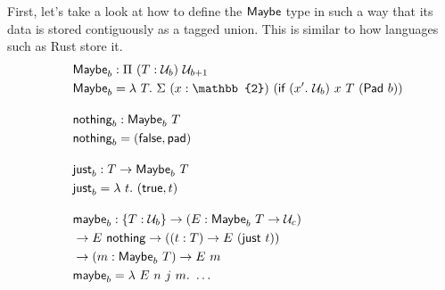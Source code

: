 First, let's take a look at how to define the \(\textsf{Maybe}\) type in
such a way that its data is stored contiguously as a tagged union. This
is similar to how languages such as Rust store it. \[
\begin{aligned}
&\syn{Maybe}_b : \Pi\ (T : \univ_b)\ \univ_{b + 1} \\
&\syn{Maybe}_b = \lambda\ T.\
\Sigma\ (x : \mathbb{2})\ (\syn{if}\ (x'.\ \univ_b)\ x\ T\ (\syn{Pad}\ b)) \\[1em]
&\syn{nothing}_b : \syn{Maybe}_b\ T \\
&\syn{nothing}_b = (\syn{false}, \syn{pad}) \\[1em]
&\syn{just}_b : T \to \syn{Maybe}_b\ T \\
&\syn{just}_b = \lambda\ t.\  (\syn{true}, t) \\[1em]
&\syn{maybe}_b : \{T : \univ_b\} \to (E : \syn{Maybe}_b\ T \to  \univ_c) \\
\quad & \to E\ \syn{nothing} \to ((t : T) \to E\ (\syn{just}\ t)) \\
\quad & \to (m : \syn{Maybe}_b\ T) \to E\ m \\
&\syn{maybe}_b = \lambda\ E\ n\ j\ m.\ \ldots
\end{aligned}
\]

